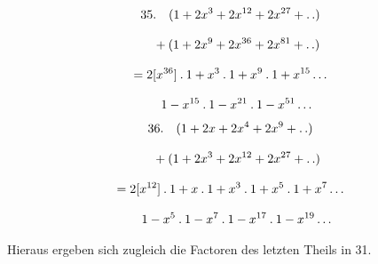 \[
\begin{gathered}
35.\quad (1+2x^{3}+2x^{12}+2x^{27}+\mathinner{.\,.})\\[8pt]\quad{}+(1+2x^{9}+2x^{36}+2x^{81}+\mathinner{.\,.})\\[8pt]
 =2[x^{36}]\mathbin{.}1+x^{3}\mathbin{.}1+x^{9}\mathbin{.}1+x^{15}\mathinner{.\,.\,.}\\[8pt]\quad{}
 1-x^{15}\mathbin{.}1-x^{21}\mathbin{.}1-x^{51}\mathinner{.\,.\,.}
\end{gathered}
\]
\[
\begin{gathered}
36.\quad (1+2x+2x^{4}+2x^{9}+\mathinner{.\,.})\\[8pt]\quad{}+(1+2x^{3}+2x^{12}+2x^{27}+\mathinner{.\,.})\\[8pt]
 =2[x^{12}]\mathbin{.}1+x\mathbin{.}1+x^{3}\mathbin{.}1+x^{5}\mathbin{.}1+x^{7}\mathinner{.\,.\,.}\\[8pt]\quad{}
 1-x^{5}\mathbin{.}1-x^{7}\mathbin{.}1-x^{17}\mathbin{.}1-x^{19}\mathinner{.\,.\,.}
\end{gathered}
\]


Hieraus ergeben sich zugleich die Factoren des letzten Theils in 31.

